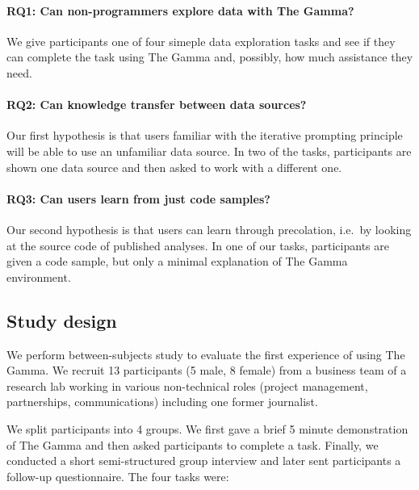 \documentclass{sigchi}
\begin{document}
\paragraph{RQ1: Can non-programmers explore data with The Gamma?}
We give participants one of four simeple data exploration tasks and see if they can complete the
task using The Gamma and, possibly, how much assistance they need.

\paragraph{RQ2: Can knowledge transfer between data sources?}
Our first hypothesis is that users familiar with the iterative prompting principle will be able to
use an unfamiliar data source. In two of the tasks, participants are shown one data source and
then asked to work with a different one.

\paragraph{RQ3: Can users learn from just code samples?}
Our second hypothesis is that users can learn through precolation, i.e.~by looking at the source
code of published analyses. In one of our tasks, participants are given a code sample, but only a
minimal explanation of The Gamma environment.

\subsection{Study design}
We perform between-subjects study to evaluate the first experience of using The Gamma.
We recruit 13 participants (5 male, 8 female) from a business team
of a research lab working in various non-technical roles (project management,
partnerships, communications) including one former journalist.

We split participants into 4 groups. We first gave a brief 5 minute demonstration of The
Gamma and then asked participants to complete a task. Finally, we conducted a short semi-structured
group interview and later sent participants a follow-up questionnaire. The four tasks were:
\end{document}
